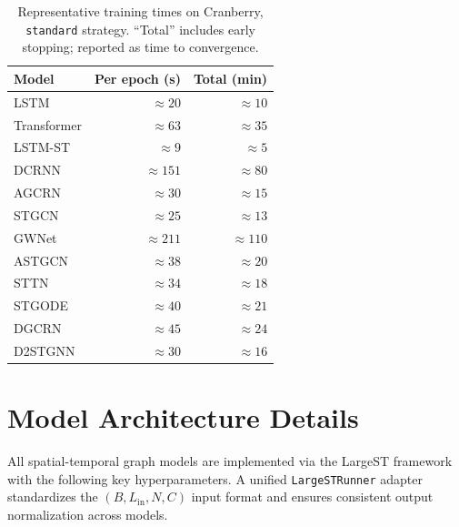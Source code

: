 \documentclass[a4paper]{cas-sc}
\begin{document}
\begin{table}[h]
\centering
\caption{Representative training times on Cranberry,
         \texttt{standard} strategy.
         ``Total'' includes early stopping; reported as
         time to convergence.}
\label{tab:training_times}
\small
\begin{tabular}{lrr}
\toprule
Model & Per epoch (s) & Total (min) \\
\midrule
LSTM           &  $\approx 20$ & $\approx 10$ \\
Transformer    &  $\approx 63$ & $\approx 35$ \\
LSTM-ST        &  $\approx 9$  & $\approx 5$  \\
DCRNN          &  $\approx 151$ & $\approx 80$ \\
AGCRN          &  $\approx 30$ & $\approx 15$ \\
STGCN          &  $\approx 25$ & $\approx 13$ \\
GWNet          &  $\approx 211$ & $\approx 110$ \\
ASTGCN         &  $\approx 38$ & $\approx 20$ \\
STTN           &  $\approx 34$ & $\approx 18$ \\
STGODE         &  $\approx 40$ & $\approx 21$ \\
DGCRN          &  $\approx 45$ & $\approx 24$ \\
D2STGNN        &  $\approx 30$ & $\approx 16$ \\
\bottomrule
\end{tabular}
\end{table}

\section{Model Architecture Details}
\label{app:architectures}

All spatial-temporal graph models are implemented via the LargeST
framework~\citep{liu2024largest} with the following key hyperparameters.
A unified \texttt{LargeSTRunner} adapter standardizes the
$(B, L_{\mathrm{in}}, N, C)$ input format and ensures consistent
output normalization across models.
\end{document}
